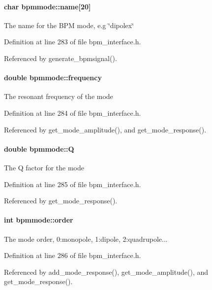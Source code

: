 \paragraph[name]{\setlength{\rightskip}{0pt plus 5cm}char {\bf bpmmode::name}[20]}\hfill\label{structbpmmode_8f3ec37ef0fdda0eeec8bf9a056f175a}


The name for the BPM mode, e.g \char`\"{}dipolex\char`\"{} 

Definition at line 283 of file bpm\_\-interface.h.

Referenced by generate\_\-bpmsignal().
\paragraph[frequency]{\setlength{\rightskip}{0pt plus 5cm}double {\bf bpmmode::frequency}}\hfill\label{structbpmmode_b17dc935c70d7e9aec15d6ce93b14046}


The resonant frequency of the mode 

Definition at line 284 of file bpm\_\-interface.h.

Referenced by get\_\-mode\_\-amplitude(), and get\_\-mode\_\-response().
\paragraph[Q]{\setlength{\rightskip}{0pt plus 5cm}double {\bf bpmmode::Q}}\hfill\label{structbpmmode_0d153f15610441366c0e2eb09089f092}


The Q factor for the mode 

Definition at line 285 of file bpm\_\-interface.h.

Referenced by get\_\-mode\_\-response().
\paragraph[order]{\setlength{\rightskip}{0pt plus 5cm}int {\bf bpmmode::order}}\hfill\label{structbpmmode_90ab04d3b70f66e6a65e2399d92f018a}


The mode order, 0:monopole, 1:dipole, 2:quadrupole... 

Definition at line 286 of file bpm\_\-interface.h.

Referenced by add\_\-mode\_\-response(), get\_\-mode\_\-amplitude(), and get\_\-mode\_\-response().
